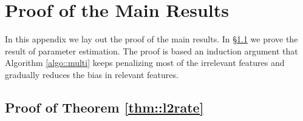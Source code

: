 \documentclass[twoside,11pt]{article}
\begin{document}

\newpage

\appendix
 
\section{Proof of the Main Results}
In this appendix we lay out the proof of the main results. In \S \ref{sec::proof_rates} we prove the result of parameter estimation. The proof is based an induction argument that Algorithm \ref{algo::multi} keeps penalizing  most of the irrelevant features and gradually reduces the bias in relevant features.

\subsection{Proof of Theorem \ref{thm::l2rate}}\label{sec::proof_rates}
\end{document}
